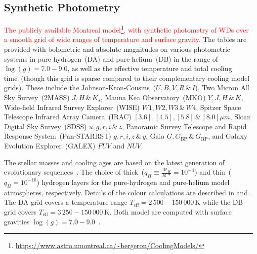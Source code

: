 \documentclass[fleqn,usenatbib]{rasti}
\begin{document}
\subsection*{Synthetic Photometry}
\textcolor{red}{The publicly available Montreal model\footnote{\url{https://www.astro.umontreal.ca/~bergeron/CoolingModels/}},
with synthetic photometry of WDs over a smooth grid of wide ranges of temperature
and surface gravity.} The tables are provided with bolometric and absolute magnitudes
on various photometric systems in pure hydrogen~(DA) and pure-helium~(DB) in the
range of $\log(g)=7.0 - 9.0$, as well as the effective temperature and total
cooling time~(though this grid is sparse compared to their complementary cooling
model grids). These include the Johnson-Kron-Cousins~($U, B, V, R\,\&\,I$),
Two Micron All Sky Survey~(2MASS) $J, H\,\&\,K_{s}$, Mauna Kea Observatory~(MKO)
$Y, J, H\,\&\,K$, Wide-field Infrared Survey Explorer~(WISE) $W1, W2, W3\,\&\,W4$,
Spitzer Space Telescope Infrared Array Camera~(IRAC)
$[3.6], [4.5], [5.8]\,\&\,[8.0] \mu m$, Sloan Digital Sky Survey~(SDSS)
$u, g, r, i\,\&\,z$, Panoramic Survey Telescope and Rapid Response
System~(Pan-STARRS\,1) $g, r, i, z\,\&\,y$,
Gaia $G, G_{\mathrm{BP}}\,\&\,G_{\mathrm{RP}}$, and Galaxy Evolution
Explorer~(GALEX) $FUV$ and $NUV$.

The stellar masses and cooling ages are based on the latest generation of
evolutionary sequences~\citep{2020ApJ...901...93B}. The choice of
thick~($q_H \equiv \frac{\mathcal{M}_H}{\mathcal{M}*} = 10^{-4}$) and thin~($q_H = 10^{-10}$)
hydrogen layers for the pure-hydrogen and pure-helium model atmospheres,
respectively. Details of the colour calculations are described in
\citet{1995PASP..107.1047B} and \citet{2006AJ....132.1221H}. The DA grid covers
a temperature range $T_{\mathrm{eff}} = 2\,500 - 150\,000$\,K while the DB grid
covers $T_{\mathrm{eff}} = 3\,250 - 150\,000$\,K. Both model are computed with
surface gravities $\log(g) = 7.0 - 9.0$~\citep{2018ApJ...863..184B,
2020ApJ...901...93B, 2011ApJ...730..128T, 2011ApJ...737...28B,
2006ApJ...651L.137K}.
\end{document}
